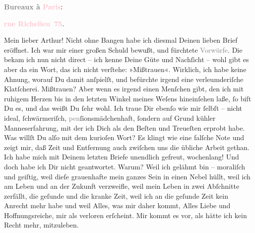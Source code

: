            \pstart
           \begin{otherlanguage}{french}\textcolor{gray}{\textbf{\textbf{Bureaux à \textcolor{pink}{Paris}{}\ledrightnote{\textcolor{pink}{Paris}}:}}}\end{otherlanguage}\pend
           \pstart
           \begin{otherlanguage}{french}\textcolor{gray}{\textbf{\textbf{\textcolor{pink}{rue Richelieu 75}{}\ledrightnote{\textcolor{pink}{rue Richelieu}}.}}}\end{otherlanguage}\pend
           \pstart
           Mein lieber Arthur!\pend
           \pstart
           Nicht ohne Bangen habe ich diesmal Deinen lieben Brief eröffnet. Ich war mir einer
               großen Schuld bewußt, und fürchtete \textcolor{gray}{Vorwürfe}. Die bekam ich nun
               nicht direct – ich kenne Deine Güte und Nachſicht – wohl gibt es aber da ein Wort,
               das ich nicht verſtehe: »Mißtrauen«. Wirklich, ich habe keine Ahnung, worauf Du damit
               anſpielſt, und befürchte irgend eine verleumderiſche Klatſcherei. Mißtrauen? Aber
               wenn es irgend einen Menſchen gibt, den ich mit ruhigem Herzen bis in den letzten
               Winkel meines Weſens hineinſehen laße, ſo {\pb}biſt Du
               es, und das weißt Du ſehr wohl. Ich traue Dir ebenſo wie mir ſelbſt – nicht ideal,
               ſchwärmeriſch, \textcolor{gray}{pen}ſionsmädchenhaft, ſondern auf Grund kühler
               Manneserfahrung, mit der ich Dich als den Beſten und Treueſten erprobt habe. Was
               willſt Du alſo mit dem kurioſen Wort? Es klingt wie eine falſche Note und zeigt mir,
               daß Zeit und Entfernung auch zwiſchen uns die übliche Arbeit gethan.\pend
           \pstart
           Ich habe mich mit Deinem letzten Briefe unendlich gefreut, wochenlang! Und doch habe
               ich Dir nicht geantwortet. Warum? Weil ich gelähmt bin – moraliſch und geiſtig, weil
                  dieſe grauenhafte \label{K_L02711-1v}\label{K_L02711-1h} mein ganzes Sein in einen Nebel hüllt, weil ich am Leben und an der Zukunft
               verzweifle, weil mein Leben {\pb}in zwei Abſchnitte
               zerfällt, die geſunde und die kranke Zeit, weil ich an die geſunde Zeit kein Anrecht
               mehr habe und weil Alles, was mir daher kommt, Alles Liebe und Hoffnungsreiche, mir
               als verloren erſcheint. Mir kommt es vor, als hätte ich kein Recht mehr, mitzuleben.
